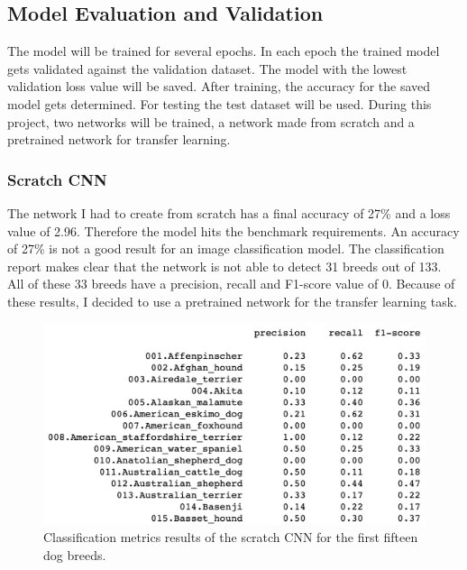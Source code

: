 \documentclass{article}
\begin{document}
\subsection{Model Evaluation and Validation}
The model will be trained for several epochs. In each epoch the trained model gets validated against the validation dataset. The model with the lowest validation loss value will be saved. After training, the accuracy for the saved model gets determined. For testing the test dataset will be used.\newline
During this project, two networks will be trained, a network made from scratch and a pretrained network for transfer learning.

\subsubsection{Scratch CNN}
The network I had to create from scratch has a final accuracy of 27\% and a loss value of 2.96. Therefore the model hits the benchmark requirements.\newline
An accuracy of 27\% is not a good result for an image classification model. The classification report makes clear that the network is not able to detect 31 breeds out of 133. All of these 33 breeds have a precision, recall and F1-score value of 0. Because of these results, I decided to use a pretrained network for the transfer learning task.
\begin{figure}[h]
    \centering
    \includegraphics[scale=0.45]{./images/scratch_classification_report}
    \caption{Classification metrics results of the scratch CNN for the first fifteen dog breeds.}
    \label{fig:scratch_cnn_class_rep}
\end{figure}
\end{document}
